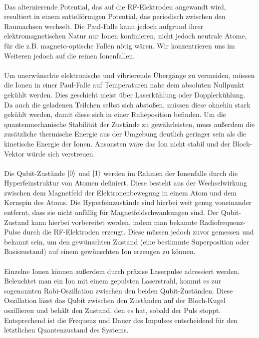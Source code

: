\\
Das alternierende Potential, das auf die RF-Elektroden angewandt wird, resultiert in einem sattelförmigen Potential, das periodisch zwischen den Raumachsen wechselt. Die Paul-Falle kann jedoch aufgrund ihrer elektromagnetischen Natur nur Ionen konfinieren, nicht jedoch neutrale Atome, für die z.B. magneto-optische Fallen nötig wären. Wir konzentrieren uns im Weiteren jedoch auf die reinen Ionenfallen. \cite{lapierre_getting_2022} %
\\
\\
Um unerwünschte elektronische und vibrierende Übergänge zu vermeiden, müssen die Ionen in einer Paul-Falle auf Temperaturen nahe dem absoluten Nullpunkt gekühlt werden. Dies geschieht meist über Laserkühlung oder Dopplerkühlung. \cite{lapierre_introduction_2021} %
Da auch die geladenen Teilchen selbst sich abstoßen, müssen diese ohnehin stark gekühlt werden, damit diese sich in einer Ruheposition befinden. \cite{homeister_quantum_2022}
Um die quantenmechanische Stabilität der Zustände zu gewährleisten, muss außerdem die zusätzliche thermische Energie aus der Umgebung deutlich geringer sein als die kinetische Energie der Ionen. Ansonsten wäre das Ion nicht stabil und der Bloch-Vektor würde sich verstreuen. \cite{kasirajan_fundamentals_2021} %
\\
\\
Die Qubit-Zustände $\ket0$ und $\ket1$ werden im Rahmen der Ionenfalle durch die Hyperfeinstruktur von Atomen definiert. Diese besteht aus der Wechselwirkung zwischen dem Magnetfeld der Elektronenbewegung in einem Atom und dem Kernspin des Atoms. Die Hyperfeinzustände sind hierbei weit genug voneinander entfernt, dass sie nicht anfällig für Magnetfeldschwankungen sind. \cite{kasirajan_fundamentals_2021} %
Der Qubit-Zustand kann hierbei vorbereitet werden, indem man bekannte Radiofrequenz-Pulse durch die RF-Elektroden erzeugt. Diese müssen jedoch zuvor gemessen und bekannt sein, um den gewünschten Zustand (eine bestimmte Superposition oder Basiszustand) auf einem gewünschten Ion erzeugen zu können.\cite{kasirajan_fundamentals_2021}%
\\
\\
Einzelne Ionen können außerdem durch präzise Laserpulse adressiert werden. Beleuchtet man ein Ion mit einem gepulsten Laserstrahl, kommt es zur sogenannten Rabi-Oszillation zwischen den beiden Qubit-Zuständen. Diese Oszillation lässt das Qubit zwischen den Zuständen auf der Bloch-Kugel oszillieren und behält den Zustand, den es hat, sobald der Puls stoppt. Entsprechend ist die Frequenz und Dauer des Impulses entscheidend für den letztlichen Quantenzustand des Systems. \cite{lapierre_introduction_2021} %
